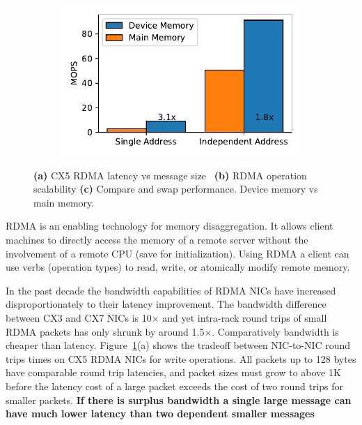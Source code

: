 \begin{figure}[t]
    \begin{subfigure}{0.3\linewidth}
        \includegraphics[width=0.99\linewidth]{fig/rdma_cas_throughput.pdf}
    \end{subfigure}
    \vspace{-1em}
    \caption{
    \textbf{(a)} CX5 RDMA latency vs message size~\cite{rdma-latency}
    \textbf{(b)} RDMA operation scalability
    \textbf{(c)} Compare and swap performance. Device memory vs main memory.
    }
    \label{fig:rdma-benchmarks}
\end{figure}

RDMA is an enabling technology for memory disaggregation. It
allows client machines to directly access the memory of a
remote server without the involvement of a remote CPU (save
for initialization).  Using RDMA a client can use verbs
(operation types) to read, write, or atomically modify
remote memory.

In the past decade the bandwidth capabilities of RDMA NICs
have increased disproportionately to their latency
improvement. The bandwidth difference between CX3 and CX7
NICs is 10$\times$ and yet intra-rack round trips of small
RDMA packets has only shrunk by around 1.5$\times$.
Comparatively bandwidth is cheaper than latency.
Figure~\ref{fig:rdma-benchmarks}(a) shows the tradeoff
between NIC-to-NIC round trips times on CX5 RDMA NICs for
write operations. All packets up to 128 bytes have
comparable round trip latencies, and packet sizes must grow
to above 1K before the latency cost of a large packet
exceeds the cost of two round trips for smaller packets.
\textbf{If there is surplus bandwidth a single large message
can have much lower latency than two dependent smaller
messages}

